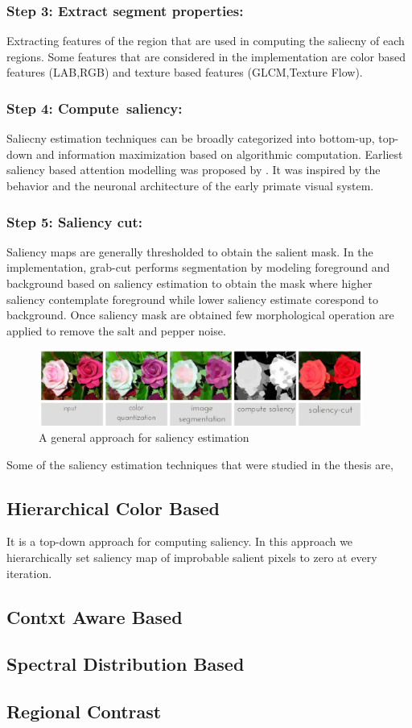 \subsubsection{Step 3: Extract segment properties:} Extracting features of the region that are used in computing the saliecny of each regions. Some features that are considered in the implementation are color based features (LAB,RGB) and texture based features (GLCM,Texture Flow).

\subsubsection{Step 4: Compute~saliency:} Saliecny estimation techniques can be broadly categorized into bottom-up, top-down and information maximization based on algorithmic computation. Earliest saliency based attention modelling was proposed by \cite{itti}. It was inspired by the behavior and the neuronal architecture of the early primate visual system.

\subsubsection{Step 5: Saliency cut:} Saliency maps are generally thresholded to obtain the salient mask. In the implementation, grab-cut\citep{grabcut} performs segmentation by modeling foreground and background based on saliency estimation to obtain the mask where higher saliency  contemplate foreground while lower saliency estimate corespond to background. Once saliency mask are obtained few morphological operation are applied to remove the salt and pepper noise.

\begin{figure}[htpb]
   \begin{center}
	    \includegraphics[width=0.95\textwidth]{snaps/sal/saliency.eps}     
     \caption {A general approach for saliency estimation}
   \label{fig:bgsub}
   \end{center}
 \end{figure}

\par Some of the saliency estimation techniques that were studied in the thesis are,
\subsection{Hierarchical Color Based}
It is a top-down approach for computing saliency. In this approach we hierarchically set saliency map of improbable salient pixels to zero at every iteration.

\subsection{Contxt Aware Based}
\subsection{Spectral Distribution Based}
\subsection{Regional Contrast}



